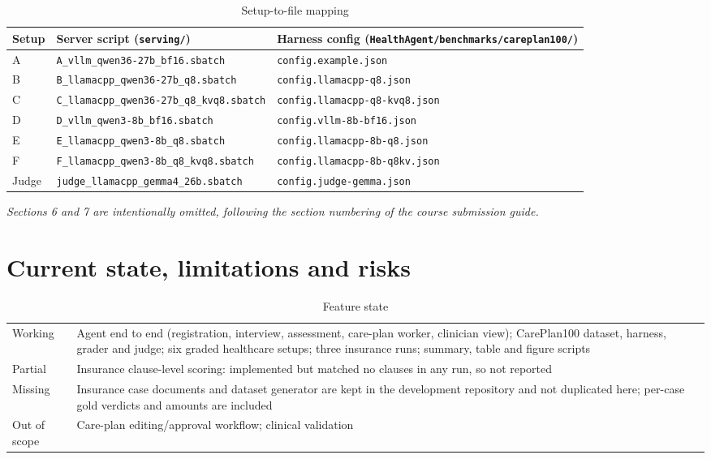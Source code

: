 \documentclass[conference]{IEEEtran}
\begin{document}
\begin{table}[t]
\caption{Setup-to-file mapping}
\label{tab:files}
\centering\footnotesize
{%
\begin{tabular}{@{}lll@{}}
\toprule
Setup & Server script (\texttt{serving/}) & Harness config (\texttt{HealthAgent/benchmarks/careplan100/}) \\
\midrule
A & \texttt{A\_vllm\_qwen36-27b\_bf16.sbatch} & \texttt{config.example.json} \\
B & \texttt{B\_llamacpp\_qwen36-27b\_q8.sbatch} & \texttt{config.llamacpp-q8.json} \\
C & \texttt{C\_llamacpp\_qwen36-27b\_q8\_kvq8.sbatch} & \texttt{config.llamacpp-q8-kvq8.json} \\
D & \texttt{D\_vllm\_qwen3-8b\_bf16.sbatch} & \texttt{config.vllm-8b-bf16.json} \\
E & \texttt{E\_llamacpp\_qwen3-8b\_q8.sbatch} & \texttt{config.llamacpp-8b-q8.json} \\
F & \texttt{F\_llamacpp\_qwen3-8b\_q8\_kvq8.sbatch} & \texttt{config.llamacpp-8b-q8kv.json} \\
Judge & \texttt{judge\_llamacpp\_gemma4\_26b.sbatch} & \texttt{config.judge-gemma.json} \\
\bottomrule
\end{tabular}}
\end{table}

\emph{Sections 6 and 7 are intentionally omitted, following the section numbering of the course submission guide.}

\setcounter{section}{7}
\section{Current state, limitations and risks}
\begin{table}[h]
\caption{Feature state}
\label{tab:state}
\centering\scriptsize
\begin{tabularx}{\columnwidth}{@{}>{\raggedright\arraybackslash}p{1.1cm}X@{}}
\toprule
Working & Agent end to end (registration, interview, assessment, care-plan worker, clinician view); CarePlan100 dataset, harness, grader and judge; six graded healthcare setups; three insurance runs; summary, table and figure scripts \\
Partial & Insurance clause-level scoring: implemented but matched no clauses in any run, so not reported \\
Missing & Insurance case documents and dataset generator are kept in the development repository and not duplicated here; per-case gold verdicts and amounts are included \\
Out of scope & Care-plan editing/approval workflow; clinical validation \\
\bottomrule
\end{tabularx}
\end{table}
\end{document}
